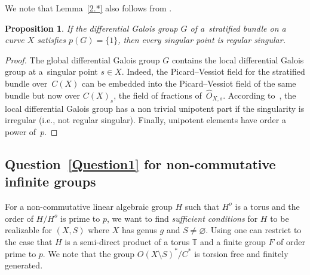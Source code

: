 \documentclass[pdftex]{sigma}
\numberwithin{equation}{section}
\newtheorem{Proposition}[Theorem]{Proposition}
\begin{document}
 We note that Lemma~\ref{2.*} also follows from \cite[Lemma~2.5(a)]{Ki}.

\begin{Proposition}\label{2.2} If the differential Galois group $G$ of a~stratified bundle on a curve $X$ satisfies $p(G)=\{1\}$, then every singular point is regular singular.
\end{Proposition}

\begin{proof} The global differential Galois group $G$ contains the local differential Galois group at a~singular point $s\in X$. Indeed, the Picard--Vessiot field for the stratified bundle over~$C(X)$ can be embedded into the Picard--Vessiot field of the same bundle but now over $C(X)_s$, the field of fractions of~$\widehat{O}_{X,s}$. According to~\cite{Ma-vdP1}, the local differential Galois group has a non trivial unipotent part if the singularity is irregular (i.e., not regular singular). Finally, unipotent elements have order a power of~$p$.
\end{proof}

\subsection{Question~\ref{Question1} for non-commutative infinite groups}\label{section2.2}

 For a non-commutative linear algebraic group $H$ such that $H^o$ is a torus and the order of $H/H^o$ is prime to $p$,
 we want to find {\it sufficient conditions} for $H$ to be realizable for $(X,S)$ where $X$ has genus $g$ and $S\neq \varnothing$.
 Using \cite[Lemma 5.11]{B-S} one can restrict to the case that $H$ is a semi-direct product of a torus $\mathbb{T}$ and a finite group $F$ of order prime to $p$. We note that the group $O(X\setminus S)^*/C^*$ is torsion free and finitely generated.
\end{document}
